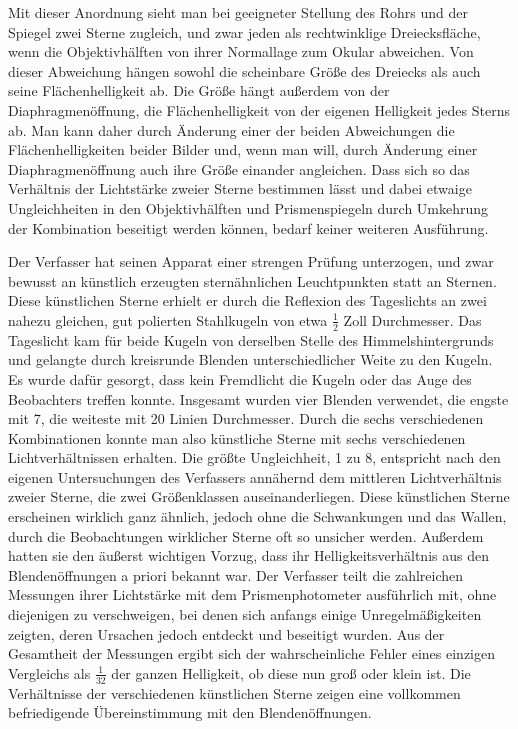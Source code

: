 Mit dieser Anordnung sieht man bei geeigneter Stellung des Rohrs und der Spiegel zwei Sterne zugleich, und zwar jeden als rechtwinklige Dreiecksfläche, wenn die Objektivhälften von ihrer Normallage zum Okular abweichen. Von dieser Abweichung hängen sowohl die scheinbare Größe des Dreiecks als auch seine Flächenhelligkeit ab. Die Größe hängt außerdem von der Diaphragmenöffnung, die Flächenhelligkeit von der eigenen Helligkeit jedes Sterns ab. Man kann daher durch Änderung einer der beiden Abweichungen die Flächenhelligkeiten beider Bilder und, wenn man will, durch Änderung einer Diaphragmenöffnung auch ihre Größe einander angleichen. Dass sich so das Verhältnis der Lichtstärke zweier Sterne bestimmen lässt und dabei etwaige Ungleichheiten in den Objektivhälften und Prismenspiegeln durch Umkehrung der Kombination beseitigt werden können, bedarf keiner weiteren Ausführung.

Der Verfasser hat seinen Apparat einer strengen Prüfung unterzogen, und zwar bewusst an künstlich erzeugten sternähnlichen Leuchtpunkten statt an Sternen. Diese künstlichen Sterne erhielt er durch die Reflexion des Tageslichts an zwei nahezu gleichen, gut polierten Stahlkugeln von etwa $\frac{1}{2}$ Zoll Durchmesser. Das Tageslicht kam für beide Kugeln von derselben Stelle des Himmelshintergrunds und gelangte durch kreisrunde Blenden unterschiedlicher Weite zu den Kugeln. Es wurde dafür gesorgt, dass kein Fremdlicht die Kugeln oder das Auge des Beobachters treffen konnte. Insgesamt wurden vier Blenden verwendet, die engste mit 7, die weiteste mit 20 Linien Durchmesser. Durch die sechs verschiedenen Kombinationen konnte man also künstliche Sterne mit sechs verschiedenen Lichtverhältnissen erhalten. Die größte Ungleichheit, 1 zu 8, entspricht nach den eigenen Untersuchungen des Verfassers annähernd dem mittleren Lichtverhältnis zweier Sterne, die zwei Größenklassen auseinanderliegen. Diese künstlichen Sterne erscheinen wirklich ganz ähnlich, jedoch ohne die Schwankungen und das Wallen, durch die Beobachtungen wirklicher Sterne oft so unsicher werden. Außerdem hatten sie den äußerst wichtigen Vorzug, dass ihr Helligkeitsverhältnis aus den Blendenöffnungen a priori bekannt war. Der Verfasser teilt die zahlreichen Messungen ihrer Lichtstärke mit dem Prismenphotometer ausführlich mit, ohne diejenigen zu verschweigen, bei denen sich anfangs einige Unregelmäßigkeiten zeigten, deren Ursachen jedoch entdeckt und beseitigt wurden. Aus der Gesamtheit der Messungen ergibt sich der wahrscheinliche Fehler eines einzigen Vergleichs als $\frac{1}{32}$ der ganzen Helligkeit, ob diese nun groß oder klein ist. Die Verhältnisse der verschiedenen künstlichen Sterne zeigen eine vollkommen befriedigende Übereinstimmung mit den Blendenöffnungen.

